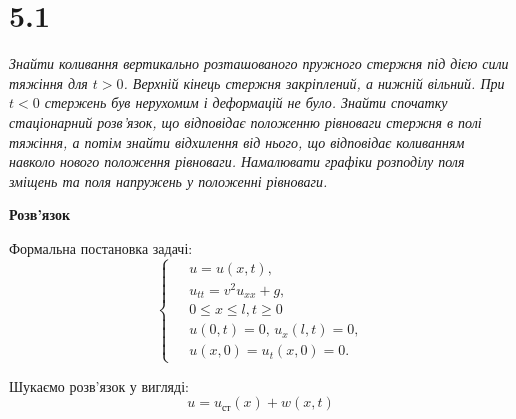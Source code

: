 


%


\section[Задача №5.1]{5.1}

\textit{Знайти коливання вертикально розташованого пружного стержня під дією сили тяжіння для $t > 0$. Верхній кінець стержня закріплений, а нижній вільний. При $t < 0$ стержень був нерухомим і деформацій не було. Знайти спочатку стаціонарний розв’язок, що відповідає положенню рівноваги стержня в полі тяжіння, а потім знайти відхилення від нього, що відповідає коливанням навколо нового положення рівноваги. Намалювати графіки розподілу поля зміщень та поля напружень у положенні рівноваги.}

\begin{center}
    \large{\textbf{Розв'язок}}
\end{center}

\noindent Формальна постановка задачі:
\begin{equation} %
    \left\{ \begin{aligned}
            \;&u = u(x,t), \\
            &u_{tt} = v^2 u_{xx} + g, \\
            &0 \leq x \leq l, t \geq 0 \\
            &u(0,t) = 0, \, u_x(l,t) = 0, \\
            &u(x,0) = u_t(x,0) = 0.
    \end{aligned} \right.
\end{equation}

Шукаємо розв'язок у вигляді:
\begin{equation}
    u = u_{\text{ст}}(x) + w(x,t)
\end{equation}

